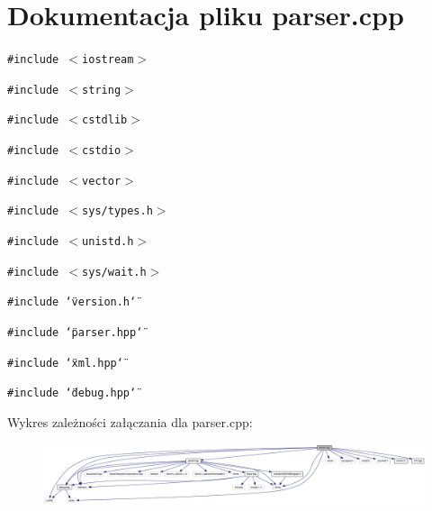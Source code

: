 \hypertarget{a00014}{
\section{Dokumentacja pliku parser.cpp}
\label{d2/de7/a00014}
}
{\tt \#include $<$iostream$>$}\par
{\tt \#include $<$string$>$}\par
{\tt \#include $<$cstdlib$>$}\par
{\tt \#include $<$cstdio$>$}\par
{\tt \#include $<$vector$>$}\par
{\tt \#include $<$sys/types.h$>$}\par
{\tt \#include $<$unistd.h$>$}\par
{\tt \#include $<$sys/wait.h$>$}\par
{\tt \#include \char`\"{}version.h\char`\"{}}\par
{\tt \#include \char`\"{}parser.hpp\char`\"{}}\par
{\tt \#include \char`\"{}xml.hpp\char`\"{}}\par
{\tt \#include \char`\"{}debug.hpp\char`\"{}}\par


Wykres zależności załączania dla parser.cpp:\nopagebreak
\begin{figure}[H]
\begin{center}
\leavevmode
\includegraphics[width=420pt]{d6/d2d/a00047}
\end{center}
\end{figure}
